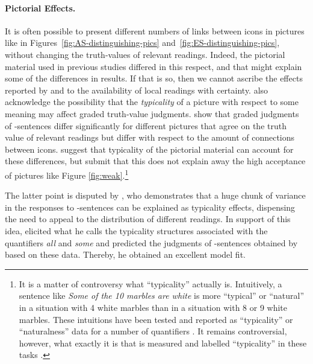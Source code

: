 \documentclass[fleqn,reqno,10pt]{article}
\newcommand{\as}{\acro{as}}
\begin{document}
\paragraph{Pictorial Effects.} It is often possible to present
different numbers of links between icons in pictures like in
Figures~\ref{fig:AS-distinguishing-pics}
and~\ref{fig:ES-distinguishing-pics}, without changing the
truth-values of relevant readings. Indeed, the pictorial material used
in previous studies differed in this respect, and that might explain
some of the differences in results. If that is so, then we cannot
ascribe the effects reported by
\citet{CliftonDube2010:Embedded-Implic} and
\citet{ChemlaSpector2010:Experimental-Ev} to the availability of local
readings with certainty. \citet{ChemlaSpector2010:Experimental-Ev}
also acknowledge the possibility that the \emph{typicality} of a
picture with respect to some meaning may affect graded truth-value
judgments. \citeauthor{ChemlaSpector2010:Experimental-Ev} show that
graded judgments of \as-sentences differ significantly for different
pictures that agree on the truth value of relevant readings but differ
with respect to the amount of connections between
icons. \citeauthor{ChemlaSpector2010:Experimental-Ev} suggest that
typicality of the pictorial material can account for these
differences, but submit that this does not explain away the high
acceptance of pictures like Figure \ref{fig:weak}.\footnote{It is a
  matter of controversy what ``typicality'' actually is. Intuitively,
  a sentence like \emph{Some of the 10 marbles are white} is more
  ``typical'' or ``natural'' in a situation with 4 white marbles than
  in a situation with 8 or 9 white marbles. These intuitions have been
  tested and reported as ``typicality'' or ``naturalness'' data for a
  number of quantifiers
  \citep{DegenTanenhaus2011:Making-Inferenc,Tielvan-Tiel2012:Embedded-Scalar,Tielvan-Tiel2014:Quantity-Matter,DegenTanenhaus2012:Processing-Scal}. It
  remains controversial, however, what exactly it is that is measured
  and labelled ``typicality'' in these tasks
  \citep[c.f.][]{Cummins2014:Typicality-made,Franke2014:Typical-use-of-}.}

The latter point is disputed by
\citet{Tielvan-Tiel2012:Embedded-Scalar}, who demonstrates that a huge
chunk of variance in the responses to \as-sentences can be explained
as typicality effects, dispensing the need to appeal to the
distribution of different readings. In support of this idea,
\citet{Tielvan-Tiel2012:Embedded-Scalar} elicited what he calls the
typicality structures associated with the quantifiers {\it all} and
{\it some} \citep[as done also
by][]{DegenTanenhaus2011:Making-Inferenc} and predicted the judgments
of \as-sentences obtained by
\citeauthor{ChemlaSpector2010:Experimental-Ev} based on these
data. Thereby, he obtained an excellent model fit.
\end{document}
